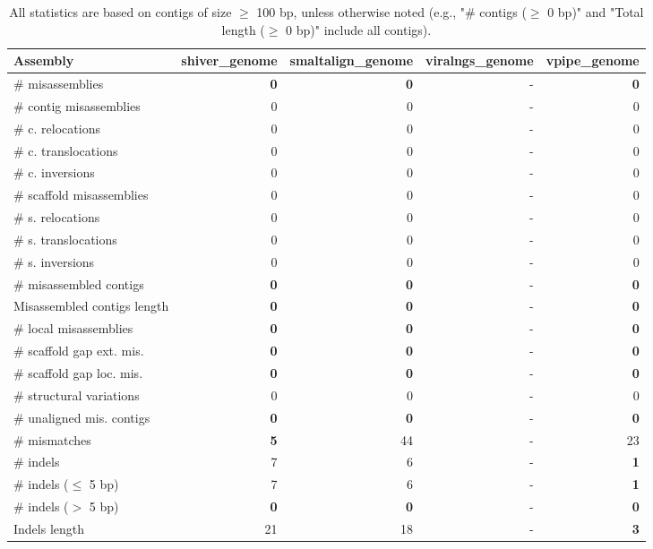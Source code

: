 \documentclass[12pt,a4paper]{article}
\begin{document}
\begin{table}[ht]
\begin{center}
\caption{All statistics are based on contigs of size $\geq$ 100 bp, unless otherwise noted (e.g., "\# contigs ($\geq$ 0 bp)" and "Total length ($\geq$ 0 bp)" include all contigs).}
\begin{tabular}{|l*{4}{|r}|}
\hline
Assembly & shiver\_genome & smaltalign\_genome & viralngs\_genome & vpipe\_genome \\ \hline
\# misassemblies & {\bf 0} & {\bf 0} & - & {\bf 0} \\ \hline
\hspace{2mm}\# contig misassemblies & 0 & 0 & - & 0 \\ \hline
\hspace{5mm}\# c. relocations & 0 & 0 & - & 0 \\ \hline
\hspace{5mm}\# c. translocations & 0 & 0 & - & 0 \\ \hline
\hspace{5mm}\# c. inversions & 0 & 0 & - & 0 \\ \hline
\hspace{2mm}\# scaffold misassemblies & 0 & 0 & - & 0 \\ \hline
\hspace{5mm}\# s. relocations & 0 & 0 & - & 0 \\ \hline
\hspace{5mm}\# s. translocations & 0 & 0 & - & 0 \\ \hline
\hspace{5mm}\# s. inversions & 0 & 0 & - & 0 \\ \hline
\# misassembled contigs & {\bf 0} & {\bf 0} & - & {\bf 0} \\ \hline
Misassembled contigs length & {\bf 0} & {\bf 0} & - & {\bf 0} \\ \hline
\# local misassemblies & {\bf 0} & {\bf 0} & - & {\bf 0} \\ \hline
\# scaffold gap ext. mis. & {\bf 0} & {\bf 0} & - & {\bf 0} \\ \hline
\# scaffold gap loc. mis. & {\bf 0} & {\bf 0} & - & {\bf 0} \\ \hline
\# structural variations & 0 & 0 & - & 0 \\ \hline
\# unaligned mis. contigs & {\bf 0} & {\bf 0} & - & {\bf 0} \\ \hline
\# mismatches & {\bf 5} & 44 & - & 23 \\ \hline
\# indels & 7 & 6 & - & {\bf 1} \\ \hline
\hspace{5mm}\# indels ($\leq$ 5 bp) & 7 & 6 & - & {\bf 1} \\ \hline
\hspace{5mm}\# indels ($>$ 5 bp) & {\bf 0} & {\bf 0} & - & {\bf 0} \\ \hline
Indels length & 21 & 18 & - & {\bf 3} \\ \hline
\end{tabular}
\end{center}
\end{table}
\end{document}
